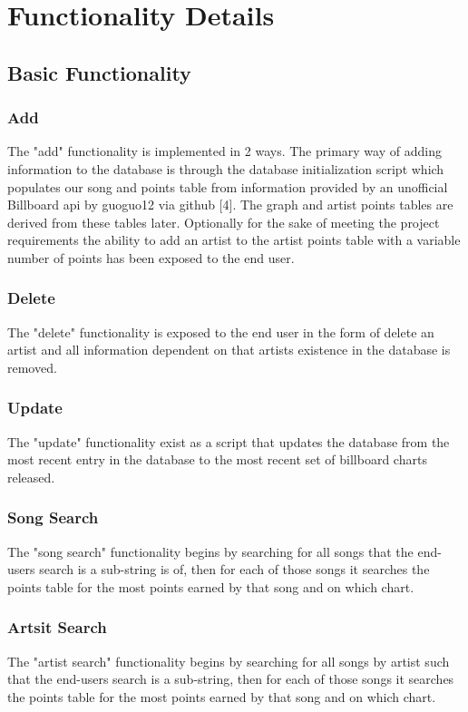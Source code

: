 \documentclass{article}
\begin{document}
\section*{Functionality Details}
\subsection*{Basic Functionality}
\subsubsection*{Add}
The "add" functionality is implemented in 2 ways. The primary way of adding information to the database is through the database initialization script which populates our song and points table from information provided by an unofficial Billboard api by guoguo12 via github [4]. The graph and artist points tables are derived from these tables later. Optionally for the sake of meeting the project requirements the ability to add an artist to the artist points table with a variable number of points has been exposed to the end user. 
\subsubsection*{Delete}
The "delete" functionality is exposed to the end user in the form of delete an artist and all information dependent on that artists existence in the database is removed.
\subsubsection*{Update}
The "update" functionality exist as a script that updates the database from the most recent entry in the database to the most recent set of billboard charts released. 
\subsubsection*{Song Search}
The "song search" functionality begins by searching for all songs that the end-users search is a sub-string is of, then for each of those songs it searches the points table for the most points earned by that song and on which chart.
\subsubsection*{Artsit Search}
The "artist search" functionality begins by searching for all songs by artist such that the end-users search is a sub-string, then for each of those songs it searches the points table for the most points earned by that song and on which chart.
\end{document}
